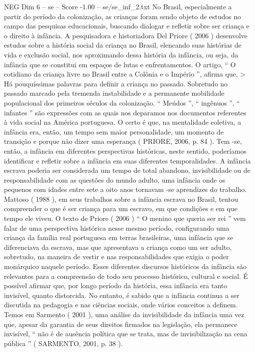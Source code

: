 \begin{textsample}{NEG Dim 6 – se – Score -1.00 – se/se\_inf\_2.txt}
No Brasil, especialmente a partir do período da colonização, as crianças foram sendo objeto de estudos no campo das pesquisas educacionais, buscando dialogar e refletir sobre ser criança e o direito à infância.
A pesquisadora e historiadora Del Priore ( 2006 ) desenvolve estudos sobre a história social da criança no Brasil, elencando suas histórias de vida e exclusão social, nos aproximando dessa história da infância, ou seja, da infância que se constitui em espaços de lutas e enfrentamentos.
O artigo, “ O cotidiano da criança livre no Brasil entre a Colônia e o Império ”, afirma que, > Há pouquíssimas palavras para definir a criança no passado.
Sobretudo no passado marcado pela tremenda instabilidade e a permanente mobilidade populacional dos primeiros séculos da colonização. “ Meúdos ”, “ ingênuos ”, “ infantes ” são expressões com as quais nos deparamos nos documentos referentes à vida social na América portuguesa.
O certo é que, na mentalidade coletiva, a infância era, então, um tempo sem maior personalidade, um momento de transição e porque não dizer uma esperança ( PRIORE, 2006, p. 84 ).
Tem -se, então, a infância em diferentes perspectivas históricas, neste sentido, poderíamos identificar e refletir sobre a infância em suas diferentes temporalidades.
A infância escrava poderia ser considerada um tempo de total abandono, invisibilidade ou de responsabilidade com as questões do mundo adulto, uma infância onde os pequenos com idades entre sete a oito anos tornavam -se aprendizes do trabalho.
Mattoso ( 1988 ), em seus trabalhos sobre a infância escrava no Brasil, tentou compreender o que é ser criança para um escravo, em que condições e em que tempo ele viveu.
O texto de Priore ( 2006 ) “ O menino que queria ser rei ” vem falar de uma perspectiva histórica nesse mesmo período, configurando uma criança da família real portuguesa em terras brasileiras, uma infância que se diferenciava da escrava, mas que apresentava a criança como um ser adulto, sobretudo, na maneira de vestir e nas responsabilidades que exigia o poder monárquico naquele período.
Esses diferentes discursos históricos da infância são relevantes para a compreensão de todo seu processo histórico, cultural e social.
É possível afirmar que, por longo período da história, essa infância era tanto invisível, quanto distorcida.
No entanto, é sabido que a infância continua a ser discutida na pedagogia e nas ciências sociais, onde vários conceitos a definem.
Temos em Sarmento ( 2001 ), uma análise da invisibilidade da infância uma vez que, apesar da garantia de seus direitos firmados na legislação, ela permanece invisível, “ não é de ausência política que se trata, mas de invisibilização na cena pública ” ( SARMENTO, 2001, p. 38 ).

\end{textsample}
